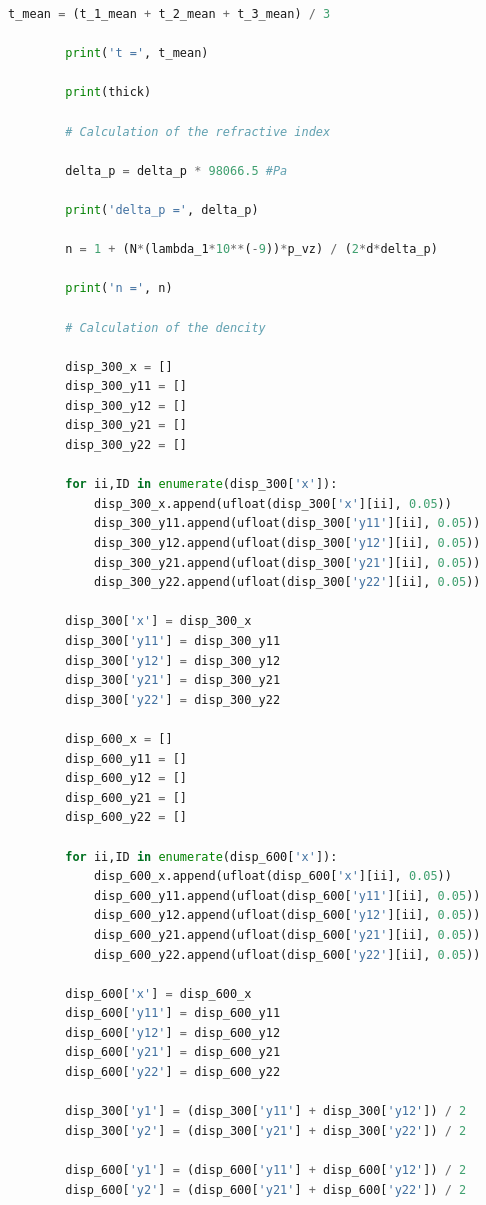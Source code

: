 \documentclass[a4paper,11pt]{article}
\begin{document}
\begin{lstlisting}[language=Python, basicstyle=\tiny, breaklines=true, postbreak=\mbox{\textbackslashspace}]
        t_mean = (t_1_mean + t_2_mean + t_3_mean) / 3

        print('t =', t_mean)

        print(thick)

        # Calculation of the refractive index

        delta_p = delta_p * 98066.5 #Pa

        print('delta_p =', delta_p)

        n = 1 + (N*(lambda_1*10**(-9))*p_vz) / (2*d*delta_p)

        print('n =', n)

        # Calculation of the dencity

        disp_300_x = []
        disp_300_y11 = []
        disp_300_y12 = []
        disp_300_y21 = []
        disp_300_y22 = []

        for ii,ID in enumerate(disp_300['x']):
            disp_300_x.append(ufloat(disp_300['x'][ii], 0.05))
            disp_300_y11.append(ufloat(disp_300['y11'][ii], 0.05))
            disp_300_y12.append(ufloat(disp_300['y12'][ii], 0.05))
            disp_300_y21.append(ufloat(disp_300['y21'][ii], 0.05))
            disp_300_y22.append(ufloat(disp_300['y22'][ii], 0.05))

        disp_300['x'] = disp_300_x
        disp_300['y11'] = disp_300_y11
        disp_300['y12'] = disp_300_y12
        disp_300['y21'] = disp_300_y21
        disp_300['y22'] = disp_300_y22

        disp_600_x = []
        disp_600_y11 = []
        disp_600_y12 = []
        disp_600_y21 = []
        disp_600_y22 = []

        for ii,ID in enumerate(disp_600['x']):
            disp_600_x.append(ufloat(disp_600['x'][ii], 0.05))
            disp_600_y11.append(ufloat(disp_600['y11'][ii], 0.05))
            disp_600_y12.append(ufloat(disp_600['y12'][ii], 0.05))
            disp_600_y21.append(ufloat(disp_600['y21'][ii], 0.05))
            disp_600_y22.append(ufloat(disp_600['y22'][ii], 0.05))

        disp_600['x'] = disp_600_x
        disp_600['y11'] = disp_600_y11
        disp_600['y12'] = disp_600_y12
        disp_600['y21'] = disp_600_y21
        disp_600['y22'] = disp_600_y22

        disp_300['y1'] = (disp_300['y11'] + disp_300['y12']) / 2
        disp_300['y2'] = (disp_300['y21'] + disp_300['y22']) / 2

        disp_600['y1'] = (disp_600['y11'] + disp_600['y12']) / 2
        disp_600['y2'] = (disp_600['y21'] + disp_600['y22']) / 2


\end{lstlisting}
\end{document}
